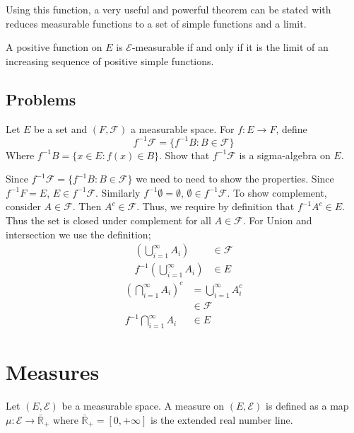 Using this function, a very useful and powerful theorem can be stated with reduces measurable functions to a set of simple functions and a limit. 

\begin{definition}\label{thm:217}
	A positive function on $E$ is $\mathcal{E}$-measurable if and only if it is the limit of an increasing sequence of positive simple functions. 
\end{definition}

\subsection{Problems}

\begin{problem}
	Let $E$ be a set and $(F, \mathcal{F})$ a measurable space. For $f:E \rightarrow F$, define 
	\begin{equation*}
		f^{-1}\mathcal{F} = \{f^{-1}B:B\in\mathcal{F}\}
	\end{equation*}
	Where $f^{-1}B = \{x \in E: f(x)\in B\}$. Show that $f^{-1}\mathcal{F}$ is a sigma-algebra on $E$.
\end{problem}

\begin{solution}
	Since $f^{-1}\mathcal{F} = \{f^{-1}B:B\in\mathcal{F}\}$ we need to need to show the properties. Since $f^{-1}F = E$, $E \in f^{-1}\mathcal{F}$. Similarly $f^{-1}\emptyset = \emptyset$, $\emptyset \in f^{-1}\mathcal{F}$. To show complement, consider $A \in \mathcal{F}$. Then $A^c \in \mathcal{F}$. Thus, we require by definition that $f^{-1}A^c \in E$. Thus the set is closed under complement for all $A \in \mathcal{F}$. For Union and intersection we use the definition;
	\begin{align*}
		\left(\bigcup_{i=1}^\infty A_i\right) &\in \mathcal{F} \\
		f^{-1}\left(\bigcup_{i=1}^\infty A_i\right) &\in E
	\end{align*}
	\begin{align*}
		\left(\bigcap_{i=1}^\infty A_i\right)^c & = \bigcup_{i=1}^\infty A_i^c\\ 
		&\in \mathcal{F} \\
		f^{-1}\bigcap_{i=1}^\infty A_i &\in E
	\end{align*}
	\fullpageboxline
\end{solution}

\section{Measures}
Let $(E, \mathcal{E})$ be a measurable space. A measure on $(E, \mathcal{E})$ is defined as a map $\mu : \mathcal{E} \rightarrow \bar{\mathbb{R}}_+$ where $\bar{\mathbb{R}}_+ = [0, +\infty]$ is the extended real number line. 

